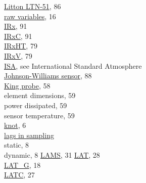 \documentclass[
]{article}
\begin{document}
\hspace*{0.333em}\hspace*{0.333em}\href{./10-obsolete-variables.html\#ltn51}{Litton
LTN-51}, 86\\
\hspace*{0.333em}\hspace*{0.333em}\href{./3-the-state-of-the-aircraft\#special-use-irs}{raw
variables}, 16\\
\href{./10-obsolete-variables.html\#irx}{IRx}, 91\\
\href{./8-radiation-variables.html\#irxc}{IRxC}, 91\\
\href{./8-radiation-variables.html\#irxht}{IRxHT}, 79\\
\href{./7-aerosol-particle-measurements.html\#trstx}{IRxV}, 79\\
\href{./3-the-state-of-the-aircraft.html\#palt}{ISA}, see International
Standard Atmosphere\\
\href{./10-obsolete-variables.html\#jwlwc}{Johnson-Williams sensor},
88\\
\href{./5-cloud-physics-variables\#plwcc}{King probe}, 58\\
\hspace*{0.333em}\hspace*{0.333em}element dimensions, 59\\
\hspace*{0.333em}\hspace*{0.333em}power dissipated, 59\\
\hspace*{0.333em}\hspace*{0.333em}sensor temperature, 59\\
\href{./2-general-information-about-data-files.html\#units-and-abbreviations}{knot},
6\\
\href{./2-general-information-about-data-files\#synchronization-of-measurements}{lags
in sampling}\\
\hspace*{0.333em}\hspace*{0.333em}static, 8\\
\hspace*{0.333em}\hspace*{0.333em}dynamic, 8
\href{./4-the-state-of-the-atmosphere\#psx}{LAMS}, 31
\href{./3-the-state-of-the-aircraft.html\#latitude}{LAT}, 28\\
\href{./3-the-state-of-the-aircraft.html\#gglat}{LAT\_G}, 18\\
\href{./3-the-state-of-the-aircraft.html\#latc-lonc}{LATC}, 27\\
\end{document}

